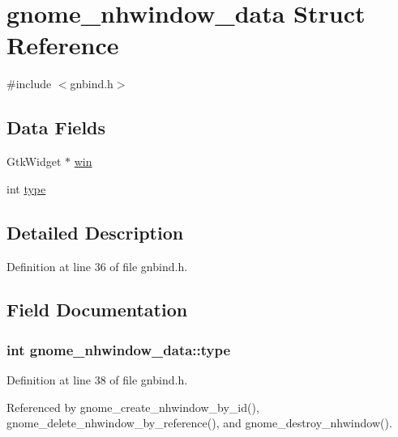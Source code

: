 \hypertarget{structgnome__nhwindow__data}{\section{gnome\+\_\+nhwindow\+\_\+data Struct Reference}
\label{structgnome__nhwindow__data}
}


{\ttfamily \#include $<$gnbind.\+h$>$}

\subsection*{Data Fields}
\begin{DoxyCompactItemize}
\item 
Gtk\+Widget $\ast$ \hyperlink{structgnome__nhwindow__data_a24bf197b2e6d5303bce3716337761b8b}{win}
\item 
int \hyperlink{structgnome__nhwindow__data_a1c843ec379ac3a244e95783919dec05c}{type}
\end{DoxyCompactItemize}


\subsection{Detailed Description}


Definition at line 36 of file gnbind.\+h.



\subsection{Field Documentation}
\hypertarget{structgnome__nhwindow__data_a1c843ec379ac3a244e95783919dec05c}{
\subsubsection[{type}]{\setlength{\rightskip}{0pt plus 5cm}int gnome\+\_\+nhwindow\+\_\+data\+::type}}\label{structgnome__nhwindow__data_a1c843ec379ac3a244e95783919dec05c}


Definition at line 38 of file gnbind.\+h.



Referenced by gnome\+\_\+create\+\_\+nhwindow\+\_\+by\+\_\+id(), gnome\+\_\+delete\+\_\+nhwindow\+\_\+by\+\_\+reference(), and gnome\+\_\+destroy\+\_\+nhwindow().

